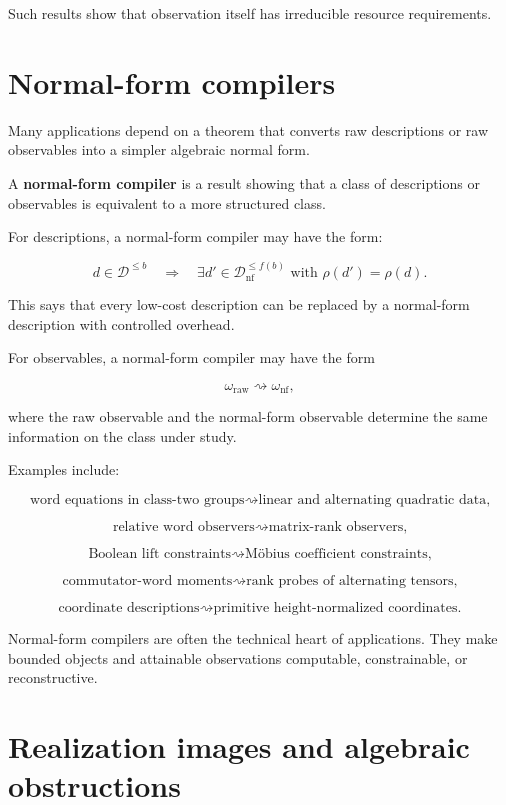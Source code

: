 \documentclass[11pt]{article}
\begin{document}
Such results show that observation itself has irreducible resource requirements.


\section{Normal-form compilers}

Many applications depend on a theorem that converts raw descriptions or raw observables into a simpler algebraic normal form.

A \textbf{normal-form compiler} is a result showing that a class of descriptions or observables is equivalent to a more structured class.

For descriptions, a normal-form compiler may have the form:

\[
d\in\mathcal D^{\leq b}
\quad\Longrightarrow\quad
\exists d'\in\mathcal D_{\mathrm{nf}}^{\leq f(b)}
\text{ with }
\rho(d')=\rho(d).
\]

This says that every low-cost description can be replaced by a normal-form description with controlled overhead.

For observables, a normal-form compiler may have the form

\[
\omega_{\mathrm{raw}}
\rightsquigarrow
\omega_{\mathrm{nf}},
\]

where the raw observable and the normal-form observable determine the same information on the class under study.

Examples include:

\[
\text{word equations in class-two groups}
\rightsquigarrow
\text{linear and alternating quadratic data,}
\]

\[
\text{relative word observers}
\rightsquigarrow
\text{matrix-rank observers,}
\]

\[
\text{Boolean lift constraints}
\rightsquigarrow
\text{Möbius coefficient constraints,}
\]

\[
\text{commutator-word moments}
\rightsquigarrow
\text{rank probes of alternating tensors,}
\]

\[
\text{coordinate descriptions}
\rightsquigarrow
\text{primitive height-normalized coordinates.}
\]

Normal-form compilers are often the technical heart of applications. They make bounded objects and attainable observations computable, constrainable, or reconstructive.


\section{Realization images and algebraic obstructions}
\end{document}
